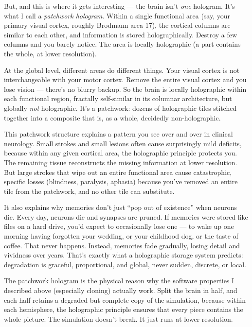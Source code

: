 \documentclass[11pt, twoside, openright]{book}
\begin{document}
But, and this is where it gets interesting --- the brain isn't \textit{one} hologram. It's what I call a \textit{patchwork hologram}. Within a single functional area (say, your primary visual cortex, roughly Brodmann area 17), the cortical columns are similar to each other, and information is stored holographically. Destroy a few columns and you barely notice. The area is locally holographic (a part contains the whole, at lower resolution).

At the global level, different areas do different things. Your visual cortex is not interchangeable with your motor cortex. Remove the entire visual cortex and you lose vision --- there's no blurry backup. So the brain is locally holographic within each functional region, fractally self-similar in its columnar architecture, but globally \textit{not} holographic. It's a patchwork: dozens of holographic tiles stitched together into a composite that is, as a whole, decidedly non-holographic.

This patchwork structure explains a pattern you see over and over in clinical neurology. Small strokes and small lesions often cause surprisingly mild deficits, because within any given cortical area, the holographic principle protects you. The remaining tissue reconstructs the missing information at lower resolution. But large strokes that wipe out an entire functional area cause catastrophic, specific losses (blindness, paralysis, aphasia) because you've removed an entire tile from the patchwork, and no other tile can substitute.

It also explains why memories don't just ``pop out of existence'' when neurons die. Every day, neurons die and synapses are pruned. If memories were stored like files on a hard drive, you'd expect to occasionally lose one --- to wake up one morning having forgotten your wedding, or your childhood dog, or the taste of coffee. That never happens. Instead, memories fade gradually, losing detail and vividness over years. That's exactly what a holographic storage system predicts: degradation is graceful, proportional, and global, never sudden, discrete, or local.

The patchwork hologram is the physical reason why the software properties I described above (especially cloning) actually work. Split the brain in half, and each half retains a degraded but complete copy of the simulation, because within each hemisphere, the holographic principle ensures that every piece contains the whole picture. The simulation doesn't break. It just runs at lower resolution.
\end{document}
